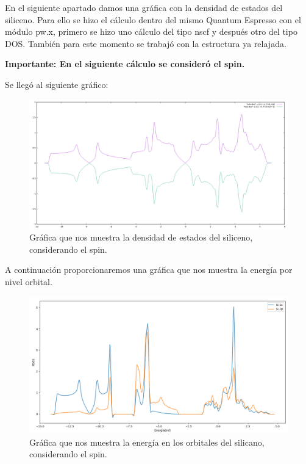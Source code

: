 En el siguiente apartado damos una gráfica con la densidad de estados del siliceno. Para 
ello se hizo el cálculo dentro del mismo Quantum Espresso con el módulo pw.x, primero se hizo uno cálculo 
del tipo nscf y después otro del tipo DOS. También para este momento se trabajó con la estructura
ya relajada.

\vspace{0.5cm}

\textbf{Importante: En el siguiente cálculo se consideró el spin.}

\vspace{0.5cm}

Se llegó al siguiente gráfico:

\begin{figure}[H]
    \centering
    \includegraphics[scale=0.33]{images_siliceno/densidad_estados_con_spin.png}
    \caption{Gráfica que nos muestra la densidad de estados del siliceno, considerando el spin.}
\end{figure}

A continuación proporcionaremos una gráfica que nos muestra la energía por nivel orbital.

\begin{figure}[H]
    \centering
    \includegraphics[scale=0.30]{images_silicano/Desnidad_por orbital.png}
    \caption{Gráfica que nos muestra la energía en los orbitales del silicano, considerando el spin.}
\end{figure}

\newpage